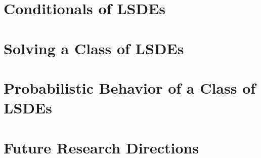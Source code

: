 \documentclass[singlespacing]{lsuthesis}
\numberwithin{equation}{section}
\theoremstyle{plain}
\theoremstyle{definition}
\theoremstyle{remark}
\begin{document}
\chapter{Conditionals of LSDEs}
\label{chp:conditional}


\chapter{Solving a Class of LSDEs}
\label{chp:solving_ALSDEs}


\chapter{Probabilistic Behavior of a Class of LSDEs}
\label{chp:probabilistic_behavior}


\chapter{Future Research Directions}
\label{chp:epilogue}




\appendix

% 


\end{document}
